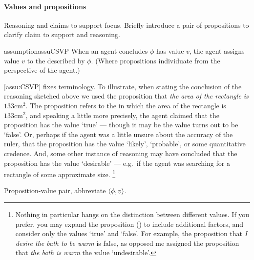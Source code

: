 \paragraph*{Values and propositions}

\begin{note}
  Reasoning and claims to support focus.
  Briefly introduce a pair of propositions to clarify claim to support and reasoning.

  \begin{restatable}{assumption}{assuCSVP}
    \label{assu:CSVP}
    When an agent concludes \(\phi\) has value \(v\), the agent assigns value \(v\) to the  described by \(\phi\).
    (Where propositions individuate  from the perspective of the agent.)
  \end{restatable}

  \autoref{assu:CSVP} fixes terminology.
  To illustrate, when stating the conclusion of the reasoning sketched above we used the proposition that \emph{the area of the rectangle is \(133\text{cm}^{2}\)}.
  The proposition refers to the \world{} in which the area of the rectangle is \(133\text{cm}^{2}\), and speaking a little more precisely, the agent claimed that the proposition has the value `true' --- though it may be the value turns out to be `false'.
  Or, perhaps if the agent was a little unsure about the accuracy of the ruler, that the proposition has the value `likely', `probable', or some quantitative credence.
  And, some other instance of reasoning may have concluded that the proposition has the value `desirable' --- e.g.\ if the agent was searching for a rectangle of some approximate size.%
  \footnote{
    Nothing in particular hangs on the distinction between different values.
    If you prefer, you may expand the proposition (\world{}) to include additional factors, and consider only the values `true' and `false'.
    For example, the proposition that \emph{I desire the bath to be warm} is false, as opposed me assigned the proposition that \emph{the bath is warm} the value `undesirable'.
  }
\end{note}

\begin{note}[Notation]
  \begin{notation}
    Proposition-value pair, abbreviate \(\langle \phi, v \rangle\).
  \end{notation}
\end{note}

